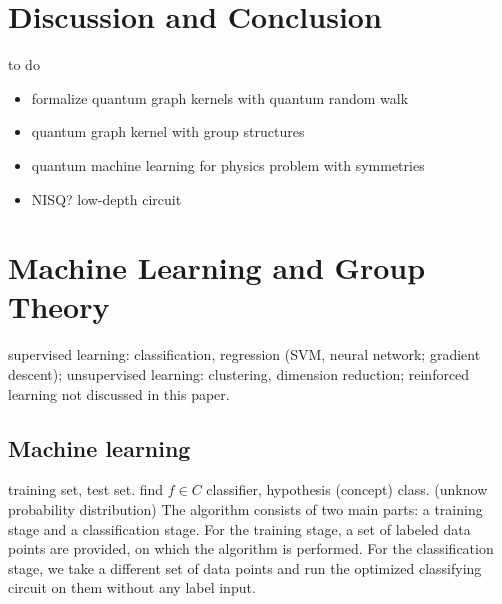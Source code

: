 \section{Discussion and Conclusion}\label{sec:discussion}
to do 
\begin{itemize}
	\item formalize quantum graph kernels with quantum random walk
	\item quantum graph kernel with group structures
	\item quantum machine learning for physics problem with symmetries
	\item NISQ? low-depth circuit
\end{itemize}

\printbibliography
\appendix

\section{Machine Learning and Group Theory}
supervised learning: classification, regression
(SVM, neural network; gradient descent);
unsupervised learning: clustering, dimension reduction;
reinforced learning not discussed in this paper.
\subsection{Machine learning}
training set, test set.
find $f\in C$ classifier, hypothesis (concept) class. (unknow probability distribution)
The algorithm consists of two main parts: a training stage and a classification stage. 
For the training stage, a set of labeled data points are provided, on which the algorithm is performed. 
For the classification stage, we take a different set of data points and run the optimized classifying circuit on them without any label input.

